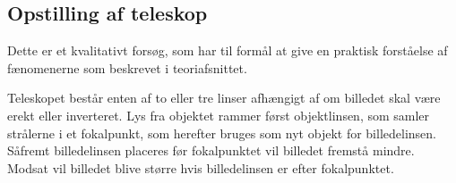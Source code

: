 \subsection{Opstilling af teleskop}
Dette er et kvalitativt forsøg, som har til formål at give en praktisk forståelse af fænomenerne som beskrevet i teoriafsnittet.

Teleskopet består enten af to eller tre linser afhængigt af om billedet skal være erekt eller inverteret. Lys fra objektet rammer først objektlinsen, som samler strålerne i et fokalpunkt, som herefter bruges som  nyt objekt for billedelinsen. Såfremt billedelinsen placeres før fokalpunktet vil billedet fremstå mindre. Modsat vil billedet blive større hvis billedelinsen er efter fokalpunktet.
